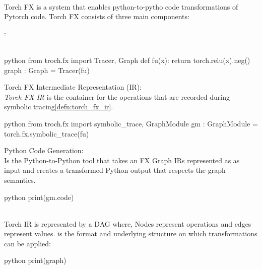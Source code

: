 \begin{defnbox}\nospacing
    \begin{defn}[Torch FX]\label{defn:torch_fx}\leavevmode\\
        Torch FX is a system that enables python-to-pytho code transformations of Pytorch code.
        Torch FX consists of three  main components:
        \begin{circlelistnosep}
            \item \textit{}:\\
            \\
            \begin{mintlinebox}{python}
                from troch.fx import Tracer, Graph
                def fu(x):
                    return torch.relu(x).neg()
                graph : Graph = Tracer(fu)
            \end{mintlinebox}
            \item Torch FX Intermediate Representation (IR): \\
            \textit{Torch FX IR} is the container for the operations that are recorded during symbolic tracing\cref{defn:torch_fx_ir}.
            \begin{mintlinebox}{python}
                from troch.fx import symbolic_trace, GraphModule
                gm : GraphModule = torch.fx.symbolic_trace(fu)
            \end{mintlinebox}
            \item Python Code Generation:\\
            Is the Python-to-Python tool that takes an FX Graph IRs represented as  as input and creates a transformed Python output that respects the graph semantics.
            \begin{mintlinebox}{python}
                print(gm.code)
            \end{mintlinebox}
        \end{circlelistnosep}
    \end{defn}
\end{defnbox}
\begin{defnbox}\nospacing
    \begin{defn}\label{defn:torch_fx_ir}\leavevmode\\
        Torch IR is represented by a DAG where, Nodes represent operations and edges represent values.
         is the format and underlying structure on which  transformations can be applied:
        \begin{mintlinebox}{python}
           print(graph)
        \end{mintlinebox}
    \end{defn}
\end{defnbox}
